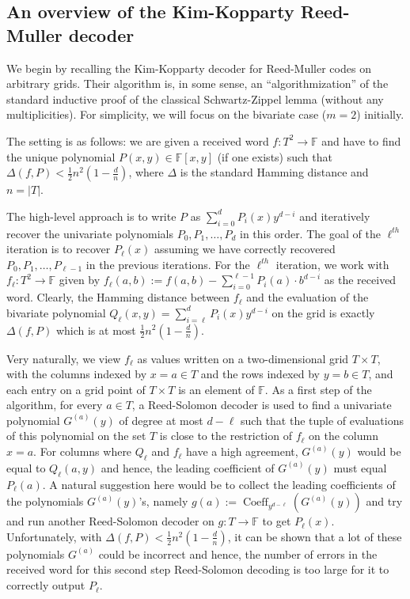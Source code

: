 \documentclass{theoretics}
\def\Field{\mathbb{F}}
\let\F\Field
\newcommand{\coeff}{\operatorname{Coeff}}
\begin{document}
	\subsection{An overview of the Kim-Kopparty Reed-Muller decoder}
	
	We begin by recalling the Kim-Kopparty decoder for Reed-Muller codes
	on arbitrary grids. Their algorithm is, in some sense, an
	``algorithmization'' of the standard inductive proof of the classical
	Schwartz-Zippel lemma (without any multiplicities). For simplicity, we
	will focus on the bivariate case ($m=2$) initially.
	
	The setting is as follows: we are given a received word
	$f\colon T^2 \to \mathbb{F}$ and have to find the unique polynomial
	$P(x, y) \in \mathbb{F}[x, y]$ (if one exists) such that
	$\Delta(f,P) < \frac{1}{2} n^2 (1-\frac{d}{n})$, where $\Delta$ is
	the standard Hamming distance and $n=|T|$.
	
	The high-level approach is to write $P$ as
	$\sum_{i=0}^d P_i(x) y^{d-i}$ and iteratively recover the univariate
	polynomials $P_0, P_1, \ldots, P_d$ in this order. The goal of the
	$\ell^{th}$ iteration is to recover $P_\ell(x)$ assuming we have
	correctly recovered $P_0, P_1,\ldots, P_{\ell-1}$ in the previous
	iterations. For the $\ell^{th}$ iteration, we work with $f_{\ell}\colon T^2 \to \F$
	given by
	$f_{\ell}(a,b) := f(a,b) - \sum_{i = 0}^{\ell-1}P_i(a)\cdot b^{d-i}$ as
	the received word. Clearly, the Hamming distance between $f_{\ell}$
	and the evaluation of the bivariate polynomial
	$Q_{\ell}(x,y) = \sum_{i = \ell}^d P_i(x)y^{d-i}$ on the grid is exactly
	$\Delta(f,P)$ which is at most $\frac{1}{2} n^2 (1-\frac{d}{n})$.  
	
	
	Very naturally, we view $f_{\ell}$ as values written on a two-dimensional grid
	$T \times T$, with the columns indexed by $x = a \in T$ and the rows
	indexed by $y = b \in T$, and each entry on a grid point of
	$T \times T$ is an element of $\F$. As a first step of the algorithm,
	for every $a \in T$, a Reed-Solomon decoder is used to find a
	univariate polynomial $G^{(a)}(y)$ of degree at most $d - \ell$ such that the tuple
	of evaluations of this polynomial on the set $T$ is close to the
	restriction of $f_{\ell}$ on the column $x = a$. For columns where $Q_{\ell}$ and $f_{\ell}$
	have a high agreement, $G^{(a)}(y)$ would be equal to $Q_{\ell}(a, y)$ and
	hence, the leading coefficient of $G^{(a)}(y)$ must equal
	$P_{\ell}(a)$. A natural suggestion here would be to collect the
	leading coefficients of the polynomials $G^{(a)}(y)$'s, namely $g(a) := \coeff_{y^{d-\ell}}(G^{(a)}(y))$  and try and run another
	Reed-Solomon decoder on $g\colon T\to \F$ to get $P_{\ell}(x)$. Unfortunately, with
	$\Delta(f,P) < \frac{1}{2} n^2 (1-\frac{d}{n})$, it can be shown that
	a lot of these polynomials $G^{(a)}$ could be incorrect and hence, the
	number of errors in the received word for this second step
	Reed-Solomon decoding is too large for it to correctly output
	$P_{\ell}$.
	
\end{document}
